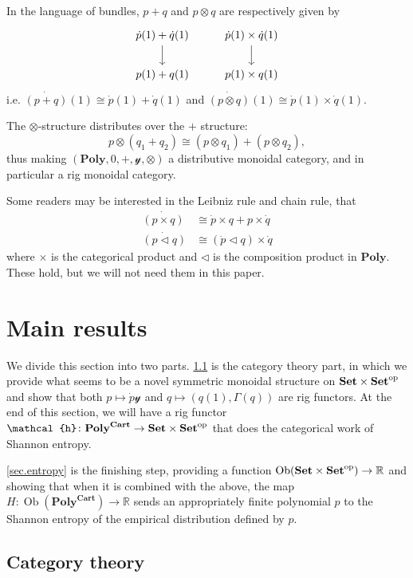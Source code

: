 \documentclass[11pt, one side, article]{memoir}
\theoremstyle{definition}
\theoremstyle{plain}
\newenvironment{remark}
  {\pushQED{\qed}\renewcommand{\qedsymbol}{$\lozenge$}\remarkx}
  {\popQED\endremarkx}
\DeclareMathOperator{\ob}{Ob}
\newcommand{\Cat}[1]{\mathbf{#1}}%
\newcommand{\op}{^\tn{op}}
\newcommand{\tn}[1]{\textnormal{#1}}
\newcommand{\rr}{\mathbb{R}}
\newcommand{\smset}{\Cat{Set}}
\newcommand{\yon}{\mathcal{y}}
\newcommand{\poly}{\Cat{Poly}}
\newcommand{\polycart}{\poly^{\Cat{Cart}}}
\newcommand{\hh}{\mathcal{h}}
\newcommand{\0}{\textsf{0}}
\newcommand{\1}{\tn{\textsf{1}}}
\newcommand{\tri}{\mathbin{\triangleleft}}
\begin{document}
In the language of bundles, $p+q$ and $p\otimes q$ are respectively given by
\[
\begin{tikzcd}
	\dot{p}(1)+\dot{q}(1)\ar[d]&\dot{p}(1)\times\dot{q}(1)\ar[d]\\
	p(1)+q(1)&p(1)\times q(1)
\end{tikzcd}
\]
i.e. $\dot{(p+q)}(1)\cong\dot{p}(1)+\dot{q}(1)$ and $\dot{(p\otimes q)}(1)\cong\dot{p}(1)\times\dot{q}(1)$.

The $\otimes$-structure distributes over the $+$ structure:
\[
p\otimes (q_1+q_2)\cong (p\otimes q_1)+(p\otimes q_2),
\]
thus making $(\poly,0,+,\yon,\otimes)$ a distributive monoidal category, and in particular a rig monoidal category.

\begin{remark}[Leibniz and chain rules]
Some readers may be interested in the Leibniz rule and chain rule, that
\begin{align*}
	\dot{(p\times q)}&\cong\dot{p}\times q+p\times\dot{q}\\
	\dot{(p\tri q)}&\cong(\dot{p}\tri q)\times\dot{q}
\end{align*}
where $\times$ is the categorical product and $\tri$ is the composition product in $\poly$. These hold, but we will not need them in this paper.
\end{remark}

\chapter{Main results}\label{chap.main}

We divide this section into two parts. \cref{sec.CT} is the category theory part, in which we provide what seems to be a novel symmetric monoidal structure on $\smset\times\smset\op$ and show that both $p\mapsto\dot{p}\yon$ and $q\mapsto(q(1),\Gamma(q))$ are rig functors. At the end of this section, we will have a rig functor $\hh\colon\polycart\to\smset\times\smset\op$ that does the categorical work of Shannon entropy.

\cref{sec.entropy} is the finishing step, providing a function $\ob(\smset\times\smset\op)\to\rr$ and showing that when it is combined with the above, the map $H\colon\ob(\polycart)\to\rr$ sends an appropriately finite polynomial $p$ to the Shannon entropy of the empirical distribution defined by $p$.

\section{Category theory}\label{sec.CT}
\end{document}
